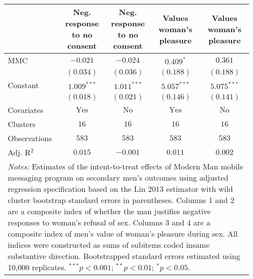 
\begin{tabular}{l c c c c}
\toprule
 & \shortstack{Neg. response \\ to no consent} & \shortstack{Neg. response \\ to no consent} & Values woman's pleasure & Values woman's pleasure \\
\midrule
MMC          & $-0.021$       & $-0.024$      & $0.409^{*}$    & $0.361$       \\
             & $(0.034)$      & $(0.036)$     & $(0.188)$      & $(0.188)$     \\
Constant     & $1.009^{***}$  & $1.011^{***}$ & $5.057^{***}$  & $5.075^{***}$ \\
             & $(0.018)$      & $(0.021)$     & $(0.146)$      & $(0.141)$     \\
\midrule
Covariates   & $\textrm{Yes}$ & $\textrm{No}$ & $\textrm{Yes}$ & $\textrm{No}$ \\
Clusters     & $16$           & $16$          & $16$           & $16$          \\
Observations & $583$          & $583$         & $583$          & $583$         \\
Adj. R$^2$   & $0.015$        & $-0.001$      & $0.011$        & $0.002$       \\
\bottomrule
\multicolumn{5}{l}{\scriptsize{\parbox{\linewidth}{\vspace{2pt}
       \textit{Notes:} Estimates of the intent-to-treat effects of Modern Man mobile
       messaging program on secondary men's outcomes using adjusted regression
       specification based on the Lin 2013 estimator with wild cluster bootstrap
       standard errors in parentheses. Columns 1 and 2 are a composite index of
       whether the man justifies negative responses to woman's refusal of sex. Columns 3 and 4
       are a composite index of men's value of woman's pleasure during sex. All indices were
       constructed as sums of subitems coded insame substantive direction. 
       Bootstrapped standard errors estimated using 10,000 replicates. \\ $^{***}p<0.001$; $^{**}p<0.01$; $^{*}p<0.05$.}}}
\end{tabular}
